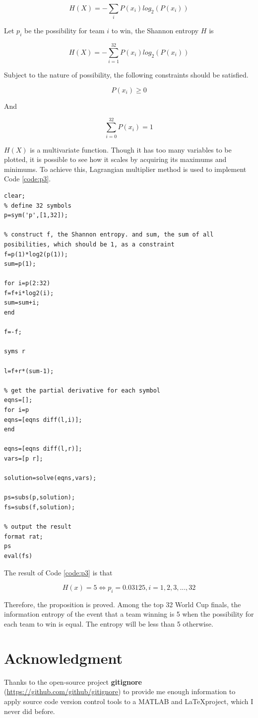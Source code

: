 \documentclass[12pt]{article}
\begin{document}
\begin{equation}
	H(X)=-\sum_{i}P(x_i)log_2(P(x_i))
\end{equation}

Let $p_i$ be the possibility for team $i$ to win, the Shannon entropy $H$ is

\begin{equation}
	H(X)=-\sum_{i=1}^{32}P(x_i)log_2(P(x_i))
\end{equation}

Subject to the nature of possibility, the following constraints should be satisfied.

\begin{equation}
	P(x_i) \ge 0
\end{equation}

And

\begin{equation}
	\sum_{i=0}^{32}P(x_i) = 1
\end{equation}

$H(X)$ is a multivariate function. Though it has too many variables to be plotted, it is possible to see how it scales by acquiring its maximums and minimums. To achieve this, Lagrangian multiplier method is used to implement Code \ref{code:p3}.

\begin{lstlisting}[style=MatlabStyle,caption=Get the maximum for $H(x)$,label=code:p3]
clear;
% define 32 symbols
p=sym('p',[1,32]);

% construct f, the Shannon entropy. and sum, the sum of all posibilities, which should be 1, as a constraint
f=p(1)*log2(p(1));
sum=p(1);

for i=p(2:32)
f=f+i*log2(i);
sum=sum+i;
end

f=-f;

syms r

l=f+r*(sum-1);

% get the partial derivative for each symbol
eqns=[];
for i=p
eqns=[eqns diff(l,i)];
end

eqns=[eqns diff(l,r)];
vars=[p r];

solution=solve(eqns,vars);

ps=subs(p,solution);
fs=subs(f,solution);

% output the result
format rat;
ps
eval(fs)
\end{lstlisting}

The result of Code \ref{code:p3} is that

\begin{equation}
	H(x)=5  \iff  p_i=0.03125, i=1,2,3,...,32
\end{equation}

Therefore, the proposition is proved. Among the top 32 World Cup finals, the information entropy of the event that a team winning is 5 when the possibility for each team to win is equal. The entropy will be less than 5 otherwise.
\section{Acknowledgment}

Thanks to the open-source project \textbf{gitignore} (\url{https://github.com/github/gitignore}) to provide me enough information to apply source code version control tools to a MATLAB and \LaTeX project, which I never did before.
\end{document}
